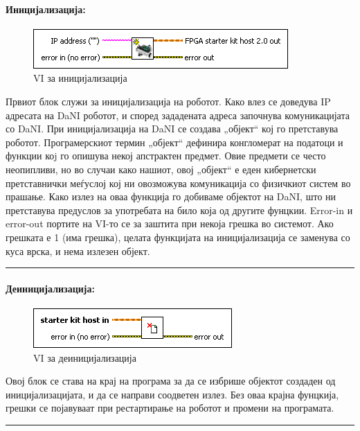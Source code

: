 \documentclass[12pt]{article}
\begin{document}
		\paragraph{Иницијализација:\\}
			\begin{figure}[h]
				\includegraphics[width=0.55\linewidth]{./images/init.png}
				\raggedright
				\caption{VI за иницијализација}
				\label{fig:init.png}
				\end{figure}
		  Првиот блок служи за иницијализација на роботот. Како влез се доведува IP адресата на DaNI роботот, и според зададената адреса започнува комуникацијата со DaNI. При иницијализација на DaNI се создава „објект“ кој го претставува роботот. Програмерскиот термин „објект“ дефинира конгломерат на податоци и функции коj го опишува некој апстрактен предмет. Овие предмети се често неопипливи, но во случаи како нашиот, овој „објект“ е еден кибернетски претставнички меѓуслој кој ни овозможува комуникација со физичкиот систем во прашање. Како излез на оваа функција го добиваме објектот на DaNI, што ни претставува предуслов за употребата на било која од другите фунцкии. Error-in и error-out портите на VI-то се за заштита при некоја грешка во системот. Ако грешката е 1 (има грешка), целата функцијата на иницијализација се заменува со куса врска, и нема излезен објект.
      \textcolor[RGB]{150,150,150}{\rule{\linewidth}{1.6pt}}

    \paragraph{Деиницијализација:\\}
    	\begin{figure}[h]
        \includegraphics[width = 0.55\linewidth]{./images/deinit.png}
				\raggedright
				\caption{VI за деиницијализација}
				\label{fig:deinit.png}
				\end{figure}
      Овој блок се става на крај на програма за да се избрише објектот создаден од иницијализацијата, и да се направи соодветен излез. Без оваа крајна фунцкија, грешки се појавуваат при рестартирање на роботот и промени на програмата.
      \textcolor[RGB]{150,150,150}{\rule{\linewidth}{1.6pt}}
\end{document}
